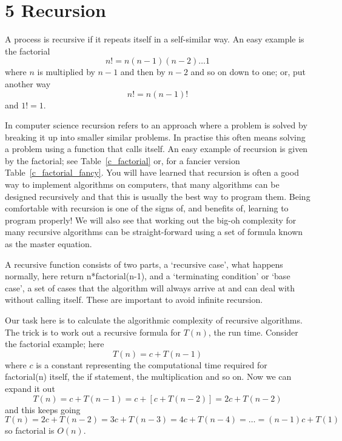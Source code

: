 \documentclass[11pt,a4paper]{scrartcl}
\begin{document}
\section*{5 Recursion}

A process is recursive if it repeats itself in a self-similar way. An
easy example is the factorial
\begin{equation}
n!=n(n-1)(n-2)\ldots 1
\end{equation}
where $n$ is multiplied by $n-1$ and then by $n-2$ and so on down to one; or, put another way
\begin{equation}
n!=n(n-1)!
\end{equation}
and $1!=1$.

In computer science recursion refers to an approach where a problem is
solved by breaking it up into smaller similar problems. In practise
this often means solving a problem using a function that calls
itself. An easy example of recursion is given by the factorial; see
Table~\ref{c_factorial} or, for a fancier version
Table~\ref{c_factorial_fancy}. You will have learned that recursion is
often a good way to implement algorithms on computers, that many
algorithms can be designed recursively and that this is usually the
best way to program them. Being comfortable with recursion is one of
the signs of, and benefits of, learning to program properly! We will
also see that working out the big-oh complexity for many recursive
algorithms can be straight-forward using a set of formula known as
the master equation.

A recursive function consists of two parts, a \lq{}recursive
case\rq{}, what happens normally, here return n*factorial(n-1), and a
\lq{}terminating condition\rq{} or \lq{}base case\rq{}, a set of cases
that the algorithm will always arrive at and can deal with without
calling itself. These are important to avoid infinite recursion.

Our task here is to calculate the algorithmic complexity of recursive
algorithms. The trick is to work out a recursive formula for $T(n)$,
the run time. Consider the factorial example; here
\begin{equation}
T(n)=c+T(n-1)
\end{equation}
where $c$ is a constant representing the computational time required
for factorial(n) itself, the if statement, the multiplication and so
on. Now we can expand it out
\begin{equation}
T(n)=c+T(n-1)=c+[c+T(n-2)]=2c+T(n-2)
\end{equation}
and this keeps going
\begin{equation}
T(n)=2c+T(n-2)=3c+T(n-3)=4c+T(n-4)=\ldots = (n-1)c+T(1)
\end{equation}
so factorial is $O(n)$. 
\end{document}
